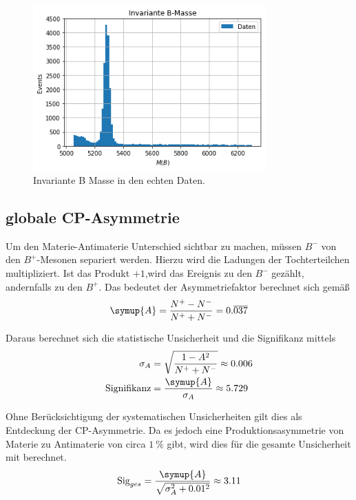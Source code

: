 \begin{figure}[htb]
  \centering
  \includegraphics[width=0.8\textwidth]{plots/real_data_inv_masse_B.png}
  \caption{Invariante B Masse in den echten Daten.}
  \label{fig:realBMass}
\end{figure}

\newpage

\subsection{globale CP-Asymmetrie}
\label{sec:globCP}

Um den Materie-Antimaterie Unterschied sichtbar zu machen, m\"ussen $B^{-}$ von den $B^{+}$-Mesonen separiert werden.
Hierzu wird die Ladungen der Tochterteilchen multipliziert.
Ist das Produkt $+1$,wird das Ereignis zu den $B^{-}$ gez\"ahlt, andernfalls zu den $B^{+}$.
Das bedeutet der Asymmetriefaktor berechnet sich gem\"a\ss
\begin{equation}
  \symup{A} = \frac{N^{+} - N^{-}}{N^{+} + N^{-}} = 0.\overline{037}
  \label{eqn:globCP}
\end{equation}

Daraus berechnet sich die statistische Unsicherheit und die Signifikanz mittels
\begin{align}
  \label{eqn:sigmaCP}
  \sigma_A &= \sqrt{\frac{1 - A^2}{N^{+} + N^{-}} } \approx 0.006 \\
  \label{eqn:signifikanzCP}
  \text{Signifikanz} &= \frac{\symup{A}}{\sigma_A} \approx 5.729
\end{align}

Ohne Ber\"ucksichtigung der systematischen Unsicherheiten gilt dies als Entdeckung der CP-Asymmetrie.
Da es jedoch eine Produktionsasymmetrie von Materie zu Antimaterie von circa $\SI{1}{\percent}$ gibt, wird dies f\"ur die gesamte Unsicherheit mit berechnet.
\begin{equation}
  \text{Sig}_{ges} = \frac{\symup{A}}{\sqrt{\sigma_A^2 + 0.01^2}} \approx 3.11
\end{equation}

